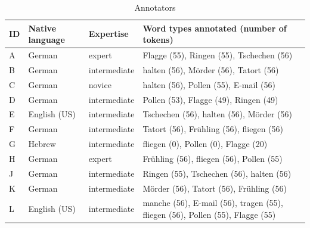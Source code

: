 	\begin{table}[htb]
		\centering
		\caption{Annotators }
		
		\begin{tabularx}{\textwidth}{lllX}
		\toprule
		ID & Native language & Expertise & Word types annotated (number of tokens) \newline \TODO{alphabetize}\\
		\midrule
		A	&	German	& expert & Flagge (55),  Ringen (55), Tschechen (56) \\
		
		B	&	German	& intermediate & 	halten (56),  M\"{o}rder (56),     Tatort (56) \\
		
		
		C & German & novice & 	halten (56),  Pollen (55),  E-mail (56)	 \\
		
		D &	German & intermediate &		Pollen (53), Flagge (49),  Ringen (49)	 %
		\\
		
		E & English (US)	& intermediate & 	Tschechen (56),  halten (56),  M\"{o}rder (56) 	 \\
		
		F & 	German	 & intermediate & 	Tatort (56), Fr\"{u}hling (56), fliegen (56)	 \\
		
		G & Hebrew	& intermediate & 	fliegen (0),  Pollen (0), Flagge (20)	 %
		\\
		
		H & German & expert &		Fr\"{u}hling (56), fliegen (56),  Pollen (55) \\
		
		J & 	German & intermediate &		Ringen (55), Tschechen (56), halten (56)	 \\
		
		K &	German	 & intermediate & M\"{o}rder (56),    Tatort (56), Fr\"{u}hling (56) \\
		
		L & English (US)	& intermediate &  manche (56),   E-mail (56),   tragen (55),	    fliegen (56),  Pollen (55), Flagge (55) \\
		

\end{tabularx}
\end{table}
